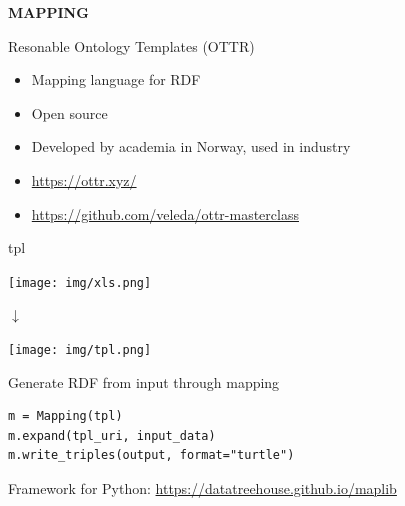 \documentclass{dt}
\begin{document}
\begin{frame}
\Huge{\textbf{MAPPING}}
\end{frame}

\begin{frame}{Resonable Ontology Templates (OTTR)}
\begin{itemize}
\item Mapping language for RDF
\item Open source
\item Developed by academia in Norway, used in industry
\item[\faGlobe{}] \url{https://ottr.xyz/}
\item[\faGithub{}] \url{https://github.com/veleda/ottr-masterclass}
\end{itemize}
\end{frame}

\begin{frame}{tpl}
\begin{center}
\texttt{[image: img/xls.png]}

\vspace{5pt}

$\downarrow$

\vspace{5pt}

\texttt{[image: img/tpl.png]}
\end{center}
\end{frame}

\begin{frame}[fragile]{Generate RDF from input through mapping}
\begin{code}
\begin{verbatim}
m = Mapping(tpl)
m.expand(tpl_uri, input_data)
m.write_triples(output, format="turtle")
\end{verbatim}
\end{code}

\vspace{10pt}

Framework for Python: \url{https://datatreehouse.github.io/maplib}

\end{frame}
\end{document}
